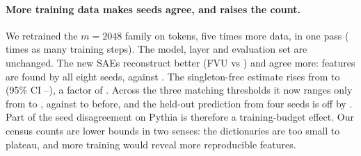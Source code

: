 \paragraph{More training data makes seeds agree, and raises the count.} We retrained the $m=2048$ family on \RealLongTokens{} tokens, five times more data, in one pass (\RealLongStepRatio{} times as many training steps). The model, layer and evaluation set are unchanged. The new SAEs reconstruct better (FVU \RealLongFvu{} vs \RealFvuTwo) and agree more: \RealLongAllSeeds{} features are found by all eight seeds, against \RealAllSeedsTwo. The singleton-free estimate rises from \RealSfTwo{} to \RealLongSf{} (95\% CI \RealLongSfLo--\RealLongSfHi), a factor of \RealLongRatio. Across the three matching thresholds it now ranges only from \RealLongTauMin{} to \RealLongTauMax, against \RealTwoTauMin{} to \RealTwoTauMax{} before, and the held-out prediction from four seeds is off by \RealLongHeldErr. Part of the seed disagreement on Pythia is therefore a training-budget effect. Our census counts are lower bounds in two senses: the dictionaries are too small to plateau, and more training would reveal more reproducible features.
